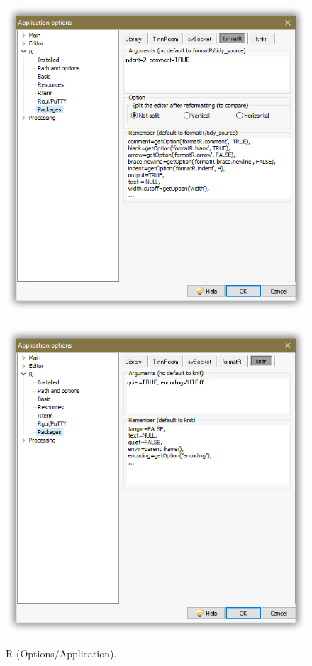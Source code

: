 \begin{figure}[h!]
  \includegraphics[scale=0.33]{./res/app_r_packages_formatr.png}~~
  \includegraphics[scale=0.33]{./res/app_r_packages_knitr.png}\\
  \caption{R (Options/Application).}
  \label{fig:app_r_c}
\end{figure}

